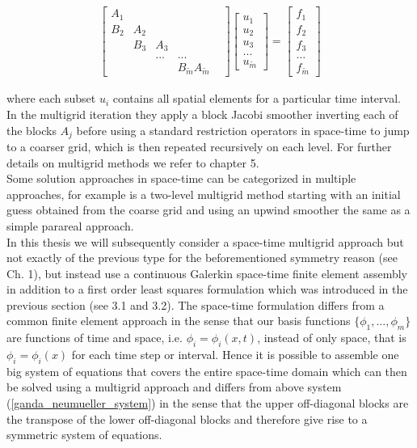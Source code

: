 \documentclass[../draft_1.tex]{subfiles}
\begin{document}
\begin{ceqn}
	\begin{equation}
	\begin{aligned}
	\label{ganda_neumueller_system}
	\begin{bmatrix}
	A_1 & & & & \\
	B_2 & A_2 & & & \\
	& B_3 & A_3 & & \\
	& & ... & ... & \\
	& & & B_{\tilde{m}} A_{\tilde{m}} 
	\end{bmatrix}
	\begin{bmatrix}
	u_1 \\
	u_2 \\
	u_3 \\
	... \\
	u_{\tilde{m}} 
	\end{bmatrix}
	= \begin{bmatrix}
	f_1 \\
	f_2 \\
	f_3 \\
	... \\
	f_{\tilde{m}} 
	\end{bmatrix}
	\end{aligned}
	\end{equation}
\end{ceqn}
where each subset $u_i$ contains all spatial elements for a particular time interval. In the multigrid iteration they apply a block Jacobi smoother inverting each of the blocks $A_j$ before using a standard restriction operators in space-time to jump to a coarser grid, which is then repeated recursively on each level. For further details on multigrid methods we refer to chapter 5. 
\smallskip
\\
Some solution approaches in space-time can be categorized in multiple approaches, for example is a two-level multigrid method starting with an initial guess obtained from the coarse grid and using an upwind smoother the same as a simple parareal approach.
\smallskip
\\
In this thesis we will subsequently consider a space-time multigrid approach but not exactly of the previous type for the beforementioned symmetry reason (see Ch. 1), but instead use a continuous Galerkin space-time finite element assembly in addition to a first order least squares formulation which was introduced in the previous section (see 3.1 and 3.2). The space-time formulation differs from a common finite element approach in the sense that our basis functions $\{\phi_1, ..., \phi_m\}$ are functions of time and space, i.e. $\phi_i = \phi_i(x,t)$, instead of only space, that is $\phi_i = \phi_i(x)$ for each time step or interval. Hence it is possible to assemble one big system of equations that covers the entire space-time domain which can then be solved using a multigrid approach and differs from above system (\ref{ganda_neumueller_system}) in the sense that the  upper off-diagonal blocks are the transpose of the lower off-diagonal blocks and therefore give rise to a symmetric system of equations. 
 
\end{document}
